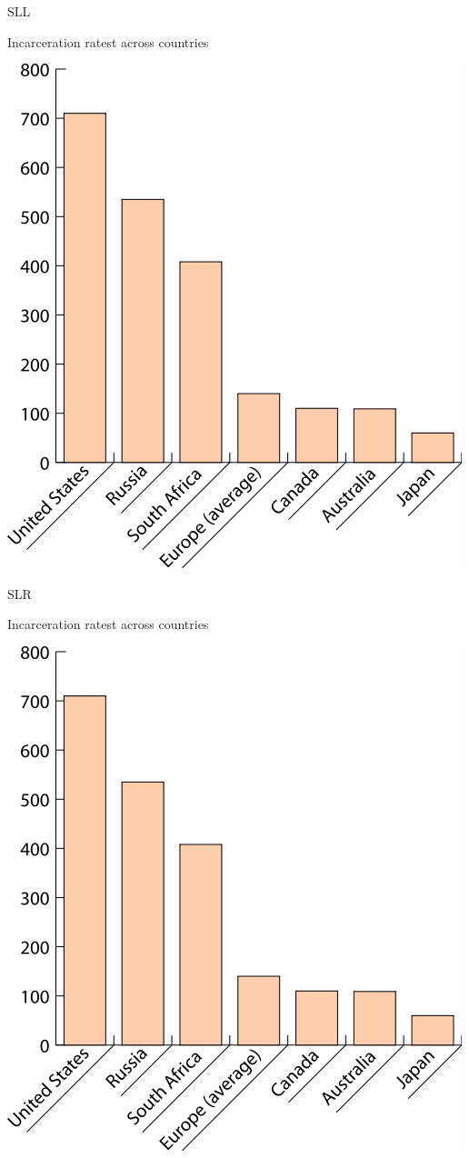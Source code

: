 \begin{chart}{S}{LL}
\caption{Incarceration ratest across countries}
\label{chart:incarceration}
\includegraphics[width=\chartwidth,height=\chartheight]{incarceration}  
\end{chart}

\begin{chart}{S}{LR}
\caption{Incarceration ratest across countries}
\label{chart:incarceration}
\includegraphics[width=\chartwidth,height=\chartheight]{incarceration}  
\end{chart}

